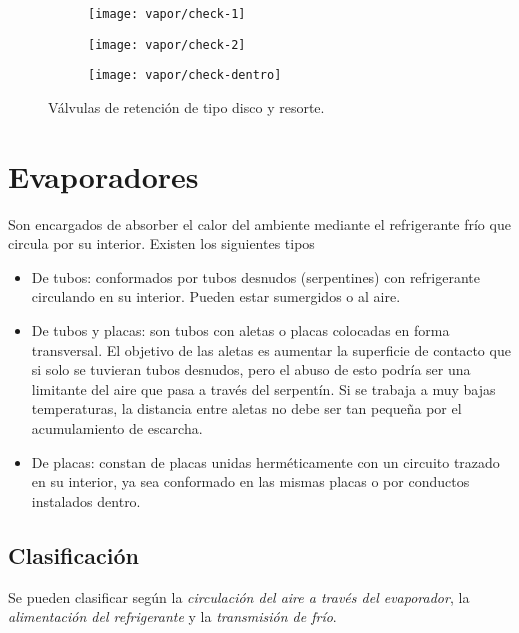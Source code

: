 \begin{figure}[h]
  \centering
  \begin{subfigure}{0.25\linewidth}
    \texttt{[image: vapor/check-1]}
  \end{subfigure}
  \begin{subfigure}{0.25\linewidth}
    \texttt{[image: vapor/check-2]}
  \end{subfigure}
  \begin{subfigure}{0.2\linewidth}
    \texttt{[image: vapor/check-dentro]}
  
  \end{subfigure}
  \caption{Válvulas de retención de tipo disco y resorte.}
  \label{fig:main}
\end{figure}




\section{Evaporadores}
Son encargados de absorber el calor del ambiente mediante el refrigerante frío que circula por su interior. Existen los siguientes tipos
\begin{itemize}
    \item De tubos: conformados por tubos desnudos (serpentines) con refrigerante circulando en su interior. Pueden estar sumergidos o al aire. 
    \item De tubos y placas: son tubos con aletas o placas colocadas en forma transversal. El  objetivo de las aletas es aumentar la superficie de contacto que si solo se tuvieran tubos desnudos, pero el abuso de esto podría ser una limitante del aire que pasa a través del serpentín. Si se trabaja a muy bajas temperaturas, la distancia entre aletas no debe ser tan pequeña por el acumulamiento de escarcha.
    \item De placas: constan de placas unidas herméticamente con un circuito trazado en su interior, ya sea conformado en las mismas placas o por conductos instalados dentro.
\end{itemize}

\subsection{Clasificación}

Se pueden clasificar según la \emph{circulación del aire a través del evaporador}, la \emph{alimentación del refrigerante} y la \emph{transmisión de frío}.

